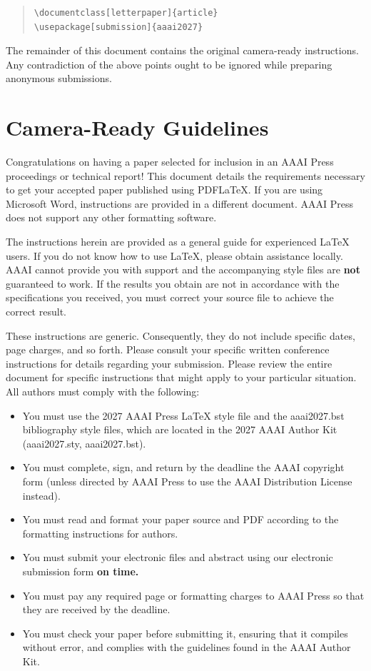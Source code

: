 \begin{quote}\begin{scriptsize}\begin{verbatim}
\documentclass[letterpaper]{article}
\usepackage[submission]{aaai2027}
\end{verbatim}\end{scriptsize}\end{quote}

The remainder of this document contains the original camera-ready instructions. Any contradiction of the above points ought to be ignored while preparing anonymous submissions.

\section{Camera-Ready Guidelines}

Congratulations on having a paper selected for inclusion in an AAAI Press proceedings or technical report! This document details the requirements necessary to get your accepted paper published using PDF\LaTeX{}. If you are using Microsoft Word, instructions are provided in a different document. AAAI Press does not support any other formatting software.

The instructions herein are provided as a general guide for experienced \LaTeX{} users. If you do not know how to use \LaTeX{}, please obtain assistance locally. AAAI cannot provide you with support and the accompanying style files are \textbf{not} guaranteed to work. If the results you obtain are not in accordance with the specifications you received, you must correct your source file to achieve the correct result.

These instructions are generic. Consequently, they do not include specific dates, page charges, and so forth. Please consult your specific written conference instructions for details regarding your submission. Please review the entire document for specific instructions that might apply to your particular situation. All authors must comply with the following:

\begin{itemize}
\item You must use the 2027 AAAI Press \LaTeX{} style file and the aaai2027.bst bibliography style files, which are located in the 2027 AAAI Author Kit (aaai2027.sty, aaai2027.bst).
\item You must complete, sign, and return by the deadline the AAAI copyright form (unless directed by AAAI Press to use the AAAI Distribution License instead).
\item You must read and format your paper source and PDF according to the formatting instructions for authors.
\item You must submit your electronic files and abstract using our electronic submission form \textbf{on time.}
\item You must pay any required page or formatting charges to AAAI Press so that they are received by the deadline.
\item You must check your paper before submitting it, ensuring that it compiles without error, and complies with the guidelines found in the AAAI Author Kit.
\end{itemize}

